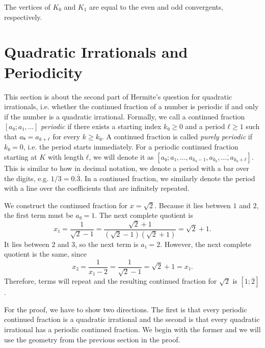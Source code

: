\begin{corollary}
  The vertices of $K_0$ and $K_1$ are equal to the
  even and odd convergents, respectively.
\end{corollary}

\section{Quadratic Irrationals and Periodicity}

This section is about the second part of Hermite's question for quadratic
irrationals, i.e. whether the continued fraction of a number is periodic if and only
if the number is a quadratic irrational.
Formally, we call a continued fraction $[a₀; a₁, …]$ \emph{periodic}
if there exists a starting index $k₀ ≥ 0$ and a period $ℓ ≥ 1$ such that $aₖ = a_{k+ℓ}$ for every $k ≥ k₀$.
A continued fraction is called \emph{purely periodic} if $k₀ = 0$,
i.e. the period starts immediately.
For a periodic continued fraction starting at $K$ with length $ℓ$,
we will denote it as $[a₀; a₁, …, a_{k₀-1}, \overline{a_{k₀}, …, a_{k₀+ℓ}}]$.
This is similar to how in decimal notation, we denote a period with a bar over the digits,
e.g. $1/3 = 0.\overline{3}$.
In a continued fraction, we similarly denote the period with a line over the
coefficients that are infinitely repeated.

\begin{example}
  We construct the continued fraction for $x = \sqrt{2}$.
  Because it lies between $1$ and $2$, the first term must be $a₀ = 1$.
  The next complete quotient is
  \[
    x₁ = \frac{1}{\sqrt{2} - 1} = \frac{\sqrt{2} + 1}{(\sqrt{2} - 1)(\sqrt{2} + 1)} = \sqrt{2} + 1.
  \]
  It lies between $2$ and $3$,
  so the next term is $a₁ = 2$.
  However, the next complete quotient is the same, since
  \[
    x₂ = \frac{1}{x₁ - 2} = \frac{1}{\sqrt{2} - 1} = \sqrt{2} + 1 = x₁.
  \]
  Therefore, terms will repeat and the resulting continued fraction for $\sqrt{2}$ is $[1; \overline{2}]$.
\end{example}

For the proof, we have to show two directions.
The first is that every periodic continued fraction is a quadratic irrational
and the second is that every quadratic irrational has a periodic continued fraction.
We begin with the former and we will use the geometry from the previous section
in the proof.

